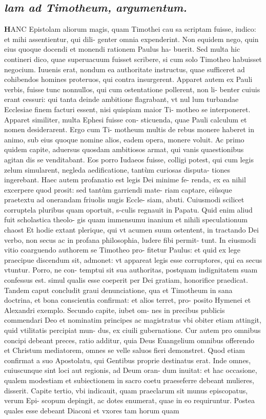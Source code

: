 \documentclass{article}
\begin{document}
\begin{pages}
\subsection*{\textit{lam ad Timotheum, argumentum. }}\pstart \huge\textbf{H}\normalsize ANC Epistolam aliorum magis, quam Timothei cau sa scriptam fuisse, iudico: et mihi assentientur, qui dili- genter omnia expenderint. Non equidem nego, quin eius quoque docendi et monendi rationem Paulus ha- buerit. Sed multa hic contineri dico, quae superuacuum fuisset scribere, si cum solo Timotheo habuisset negocium. Iuuenis erat, nondum ea authoritate instructus, quae sufficeret ad cohibendos homines proteruos, qui contra insurgerent. Apparet autem ex Pauli verbis, fuisse tunc nonnullos, qui cum ostentatione pollerent, non li- benter cuiuis erant cessuri: qui tanta deinde ambitione flagrabant, vt nul lum turbandae Ecclesiae finem facturi essent, nisi quispiam maior Ti- motheo se interponeret. Apparet similiter, multa Ephesi fuisse con- sticuenda, quae Pauli calculum et nomen desiderarent. Ergo cum Ti- motheum multis de rebus monere haberet in animo, sub eius quoque nomine alios, eadem opera, monere voluit. Ac primo quidem capite, aduersus quosdam ambitiosos armat, qui vanis quaestionibus agitan dis se venditabant. Eos porro Iudaeos fuisse, colligi potest, qui cum legis zelum simularent, negleda aedificatione, tantùm curiosas disputa- tiones ingerebant. Haec autem profanatio est legis Dei minime fe- renda, ex ea nihil excerpere quod prosit: sed tantùm garriendi mate- riam captare, eiûsque praetextu ad onerandam friuolis nugis Eccle- siam, abuti. Cuiusmodi scilicet corruptela pluribus quam oportuit, s-culis regnauit in Papatu. Quid enim aliud fuit scholastica theolo- gis quam immensumu inanium et nihili speculationum chaost Et hodie extant plerique, qui vt acumen suum ostentent, in tractando Dei verbo, non secus ac in profana philosophia, ludere fibi permit- tunt. In eiusmodi vitio coarguendo authorem se Timotheo pro- fitetur Paulus: et quid ex lege praecipue discendum sit, admonet: vt appareat legis esse corruptores, qui ea secus vtuntur. Porro, ne con- temptui sit sua authoritas, postquam indignitatem suam confessus est. simul qualis esse coeperit per Dei gratiam, honorifice praedicat. Tandem caput concludit graui denunciatione, qua et Timotheum in sana doctrina, et bona conscientia confirmat: et alios terret, pro- posito Hymenei et Alexandri exemplo. Secundo capite, iubet om- nes in precibus publicis commendari Deo et nominatim principes ac magistratus vbi obiter etiam attingit, quid vtilitatis percipiat mun- dus, ex ciuili gubernatione. Cur autem pro omnibus concipi debeant preces, ratio additur, quia Deus Euangelium omnibus offerendo et Christum mediatorem, omnes se velle saluos fieri demonstret. Quod  \pend\pstart etiam confirmat a suo Apostolatu, qui Gentibus proprie destinatus erat. Inde omnes, cuiuscunque sint loci aut regionis, ad Deum oran- dum inuitat: et hac occasione, qualem modestiam et subiectionem in sacro coetu praeseferre debeant mulieres, disserit. Capite tertio, vbi indicauit, quam praeclarum sit munus episcopatus, verum Epi- scopum depingit, ac dotes enumerat, quae in eo requiruntur. Postea quales esse debeant Diaconi et vxores tam horum quam 
\end{pages}
\end{document}
